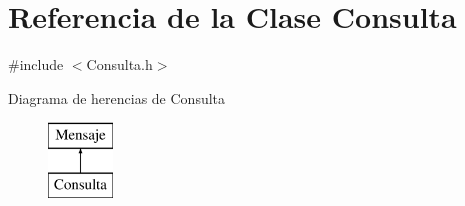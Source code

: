 \hypertarget{classConsulta}{\section{\-Referencia de la \-Clase \-Consulta}
\label{classConsulta}
}


{\ttfamily \#include $<$\-Consulta.\-h$>$}

\-Diagrama de herencias de \-Consulta\begin{figure}[H]
\begin{center}
\leavevmode
\includegraphics[height=2.000000cm]{classConsulta}
\end{center}
\end{figure}
